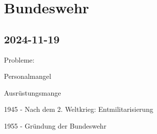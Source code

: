 \chapter{Bundeswehr}

\section{2024-11-19}

\startitemize[packed]
\item Probleme:
\startitemize[packed]
\item Personalmangel
\item Ausrüstungsmange
\stopitemize
\stopitemize

\startitemize[packed]
\item 1945 - Nach dem 2. Weltkrieg: Entmilitarisierung
\item 1955 - Gründung der Bundeswehr
\stopitemize
